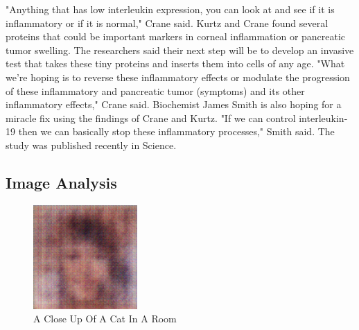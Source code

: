 \documentclass{article}%
\begin{document}
"Anything that has low interleukin expression, you can look at and see if it is inflammatory or if it is normal," Crane said.\newline%
Kurtz and Crane found several proteins that could be important markers in corneal inflammation or pancreatic tumor swelling.\newline%
The researchers said their next step will be to develop an invasive test that takes these tiny proteins and inserts them into cells of any age.\newline%
"What we're hoping is to reverse these inflammatory effects or modulate the progression of these inflammatory and pancreatic tumor (symptoms) and its other inflammatory effects," Crane said.\newline%
Biochemist James Smith is also hoping for a miracle fix using the findings of Crane and Kurtz.\newline%
"If we can control interleukin{-}19 then we can basically stop these inflammatory processes," Smith said.\newline%
The study was published recently in Science.

%
\subsection{Image Analysis}%
\label{subsec:ImageAnalysis}%


\begin{figure}[h!]%
\centering%
\includegraphics[width=150px]{500_fake_images/samples_5_240.png}%
\caption{A Close Up Of A Cat In A Room}%
\end{figure}

%
\end{document}
